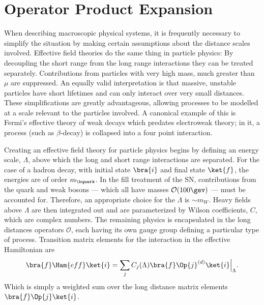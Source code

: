 \section{Operator Product Expansion}



When describing macroscopic physical systems, it is frequently necessary to simplify the situation by making
certain assumptions about the distance scales involved.
Effective field theories do the same thing in particle physics:
By decoupling the short range from the long range interactions they can be treated separately.
Contributions from particles with very high mass, much greater than $\mu$ are suppressed.
An equally valid interpretation is that massive, unstable particles have short lifetimes and can
only interact over very small distances.
These simplifications are greatly advantageous, allowing processes to be modelled at a scale
relevant to the particles involved.
A canonical example of this is Fermi's effective theory of weak decays which predates electroweak
theory; in it, a process (such as $\beta$-decay) is collapsed into a four point interaction.

Creating an effective field theory for particle physics begins by defining an energy scale,
$\Lambda$, above which the long and short range interactions are separated.
For the case of a \bquark hadron decay, with initial state $\bra{i}$ and final state $\ket{f}$,
the energies are of order $m_\bquark$.
In the fill treatment of the SN, contributions from the \tquark quark and weak bosons --- which all
have masses $\mathcal{O}(100\gev)$ --- must be accounted for.
Therefore, an appropriate choice for the $\Lambda$ is $\sim m_W$.
Heavy fields above $\Lambda$ are then integrated out and are parameterized by Wilson coefficients,
$C$, which are complex numbers.
The remaining physics is encapsulated in the long distances operators $\mathcal{O}$, each having
its own gauge group defining a particular type of process.
Transition matrix elements for the interaction in the effective Hamiltonian are
\begin{equation}
  \bra{f}\Ham{eff}\ket{i} =
  \sum_j C_j(\Lambda)\bra{f}\Op{j}^{(d)}\ket{i}\Big|_{\Lambda}.
\end{equation}
Which is simply a weighted sum over the long distance matrix elements $\bra{f}\Op{j}\ket{i}$.


